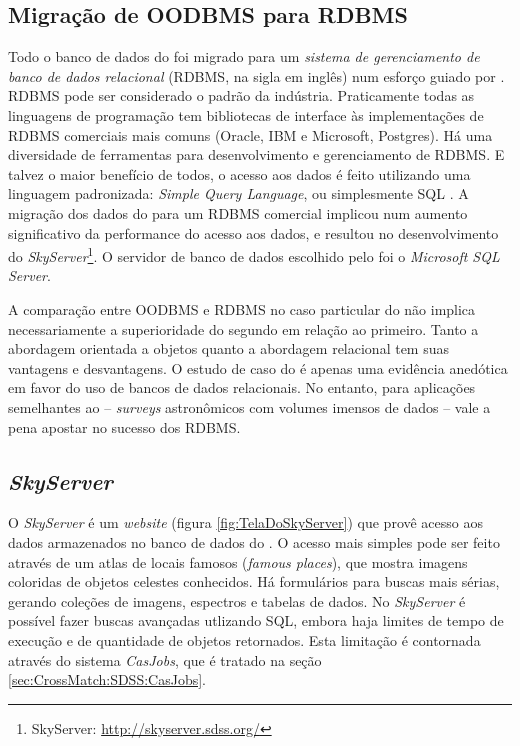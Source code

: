 \subsection{Migração de OODBMS para RDBMS}
\label{sec:CrossMatch:SDSS:MigracaoRDBMS}

Todo o banco de dados do \SDSS foi migrado para um {\em sistema de gerenciamento
de banco de dados relacional} \citep{Codd1970} (RDBMS, na sigla em inglês) num
esforço guiado por \citeauthor{Thakar2004}. RDBMS pode ser considerado o padrão
da indústria. Praticamente todas as linguagens de programação tem bibliotecas de
interface às implementações de RDBMS comerciais mais comuns (Oracle, IBM e
Microsoft, Postgres). Há uma diversidade de ferramentas para desenvolvimento e
gerenciamento de RDBMS. E talvez o maior benefício de todos, o acesso aos dados
é feito utilizando uma linguagem padronizada: {\em Simple Query Language}, ou
simplesmente SQL \citep{Chamberlin1974}. A migração dos dados do \SDSS para um
RDBMS comercial implicou num aumento significativo da performance do acesso aos
dados, e resultou no desenvolvimento do {\em SkyServer}\footnote{\SDSS
SkyServer: \url{http://skyserver.sdss.org/}}. O servidor de banco de dados
escolhido pelo \SDSS foi o {\em Microsoft SQL Server}.

A comparação entre OODBMS e RDBMS no caso particular do \SDSS não implica
necessariamente a superioridade do segundo em relação ao primeiro. Tanto a
abordagem orientada a objetos quanto a abordagem relacional tem suas vantagens e
desvantagens. O estudo de caso do \SDSS é apenas uma evidência anedótica em
favor do uso de bancos de dados relacionais. No entanto, para aplicações
semelhantes ao \SDSS -- {\em surveys} astronômicos com volumes imensos de dados
-- vale a pena apostar no sucesso dos RDBMS.

\subsection{{\em SkyServer}}
\label{sec:CrossMatch:SDSS:SkyServer}

O {\em SkyServer} é um {\em website} (figura \ref{fig:TelaDoSkyServer}) que
provê acesso aos dados armazenados no banco de dados do \SDSS
\citep{Szalay2002}. O acesso mais simples pode ser feito através de um atlas de
locais famosos ({\em famous places}), que mostra imagens coloridas de objetos
celestes conhecidos. Há formulários para buscas mais sérias, gerando coleções de
imagens, espectros e tabelas de dados. No {\em SkyServer} é possível fazer
buscas avançadas utlizando SQL, embora haja limites de tempo de execução e de
quantidade de objetos retornados. Esta limitação é contornada através do sistema
{\em CasJobs}, que é tratado na seção \ref{sec:CrossMatch:SDSS:CasJobs}.

